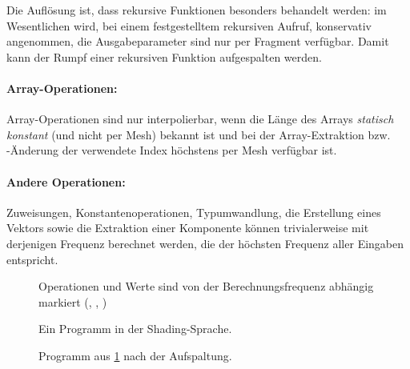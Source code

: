 \documentclass[twoside,a4paper,fleqn,12pt]{article}
\begin{document}
Die Auflösung ist, dass rekursive Funktionen besonders behandelt werden: im Wesentlichen wird, bei einem festgestelltem
rekursiven Aufruf, konservativ angenommen, die Ausgabeparameter sind nur per Fragment verfügbar. Damit kann der Rumpf
einer rekursiven Funktion aufgespalten werden.



% 

\paragraph{Array-Operationen:} Array-Operationen sind nur interpolierbar, wenn die Länge des Arrays \emph{statisch konstant}
(und nicht per Mesh) bekannt ist und bei der Array-Extraktion bzw. -Änderung der verwendete Index höchstens per Mesh
verfügbar ist.

\paragraph{Andere Operationen:} Zuweisungen, Konstantenoperationen, Typumwandlung, die Erstellung eines Vektors sowie
die Extraktion einer Komponente können trivialerweise mit derjenigen Frequenz berechnet werden, die der höchsten Frequenz
aller Eingaben entspricht.

\begin{figure}[hp]
  
  \caption{Ein Programm in der Shading-Sprache.}
  \centering
  \small Operationen und Werte sind von der Berechnungsfrequenz abhängig markiert (, , )
  \label{fig:simple_s1}
\end{figure}

\begin{figure}[!ht]
  \centering
  
  \caption{Programm aus \ref{fig:simple_s1} nach der Aufspaltung.}
  \label{fig:simple_s1_split}
\end{figure}
\end{document}
